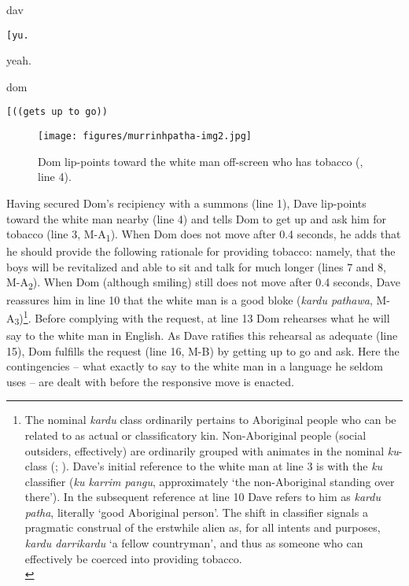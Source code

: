 \documentclass[output=paper,nonflat,colorlinks,citecolor=brown]{langsci/langscibook}
\begin{document}
%
\begin{transbox}{15}{dav}
\begin{verbatim}
[yu.
\end{verbatim}
\hspace{0.07cm} yeah.
\end{transbox}
%
\begin{mdframednoverticalspace}[style=secondfoc]
\begin{transbox}{16}{dom}
\begin{verbatim}
[((gets up to go))
\end{verbatim}
\end{transbox}
\end{mdframednoverticalspace}

\begin{figure}
\texttt{[image: figures/murrinhpatha-img2.jpg]}
\caption{Dom lip-points toward the white man off-screen who has tobacco (, line 4).
\label{fig:blythe:2}}\end{figure}

Having secured Dom’s recipiency with a summons (line 1), Dave lip-points toward the white man nearby (line 4) and tells Dom to get up and ask him for tobacco (line 3, M-A\textsubscript{1}). When Dom does not move after 0.4 seconds, he adds that he should provide the following rationale for providing tobacco: namely, that the boys will be revitalized and able to sit and talk for much longer (lines 7 and 8, M-A\textsubscript{2}). When Dom (although smiling) still does not move after 0.4 seconds, Dave reassures him in line 10 that the white man is a good bloke (\textit{kardu pathawa}, M-A\textsubscript{3})\footnote{The nominal \textit{kardu} class ordinarily pertains to Aboriginal people who can be related to as actual or classificatory kin. Non-Aboriginal people (social outsiders, effectively) are ordinarily  grouped with animates in the nominal \textit{ku}{}-class (\citealt{Walsh1997}; \citealt{Blythe2015}). Dave’s initial reference to the white man at line 3 is with the \textit{ku} classifier (\textit{ku karrim pangu}, approximately ‘the non-Aboriginal standing over there’). In the subsequent reference at line 10 Dave refers to him as \textit{kardu patha}, literally ‘good Aboriginal person’. The shift in classifier signals a pragmatic construal of the erstwhile alien as, for all intents and purposes, \textit{kardu darrikardu} ‘a fellow countryman’, and thus as someone who can effectively be coerced into providing tobacco.\\
}.  Before complying with the request, at line 13 Dom rehearses what he will say to the white man in English. As Dave ratifies this rehearsal as adequate (line 15), Dom fulfills the request (line 16, M-B) by getting up to go and ask. Here the contingencies -- what exactly to say to the white man in a language he seldom uses -- are dealt with before the responsive move is enacted.
\end{document}
